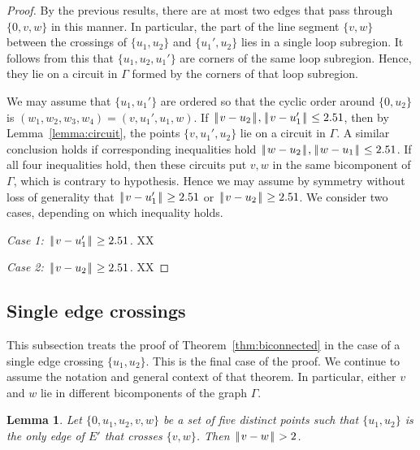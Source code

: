 \documentclass[11pt]{amsart}
\def\|{{\hskip0.1em|\hskip-0.15em|\hskip0.1em}}
\newtheorem{lemma}{Lemma}
\begin{document}
\begin{proof}  By the previous results, there are at most two edges that pass through $\{0,v,w\}$
in this manner.  In particular, the part of the line segment $\{v,w\}$ between the crossings
of $\{u_1,u_2\}$ and $\{u_1',u_2\}$ lies in a single loop subregion.  It follows from this that
$\{u_1,u_2,u_1'\}$ are corners of the same loop subregion.  Hence, they lie on a circuit in $\Gamma$
formed by the corners of that loop subregion.  

We may assume that $\{u_1,u_1'\}$ are ordered so that the cyclic order around $\{0,u_2\}$ is
$(w_1,w_2,w_3,w_4)=(v,u_1',u_1,w)$.  If $\|v-u_2\|,\|v-u_1'\|\le 2.51$, then by Lemma~\ref{lemma:circuit}, the points
$\{v,u_1',u_2\}$ lie on a circuit in $\Gamma$.  A similar conclusion holds if corresponding inequalities
hold $\|w-u_2\|,\|w-u_1\|\le 2.51$.  If all four inequalities hold, then these circuits put $v,w$ in the
same bicomponent of $\Gamma$, which is contrary to hypothesis.  Hence we may assume by symmetry without
loss of generality that $\|v-u_1'\|\ge 2.51$ or $\|v-u_2\|\ge 2.51$.  We consider two cases, depending on which
inequality holds.

{\it Case 1: $\|v-u_1'\|\ge 2.51$.} XX


{\it Case 2: $\|v-u_2\|\ge 2.51$.}  XX
\end{proof}

\subsection*{Single edge crossings}

This subsection treats the proof of Theorem~\ref{thm:biconnected}
in the case of a single edge crossing $\{u_1,u_2\}$.  This is
the final case of the proof.
We continue to assume the notation and general context of that theorem.
In particular, either $v$ and $w$ lie in different bicomponents of
the graph $\Gamma$.

\begin{lemma}  Let $\{0,u_1,u_2,v,w\}$ be a set of five distinct
points such that $\{u_1,u_2\}$ is the only edge of $E'$ that
crosses $\{v,w\}$.  Then $\|v-w\|>2$.
\end{lemma}
\end{document}
